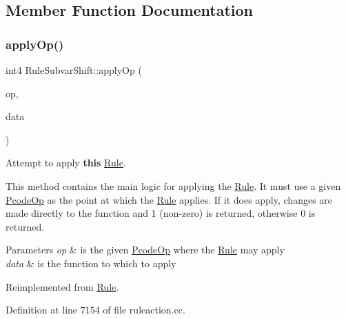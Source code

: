 \subsection{Member Function Documentation}
\mbox{\label{class_rule_subvar_shift_abfeba5a6e02b0d29a5cf98f34d3c3220}} 
\subsubsection{\texorpdfstring{applyOp()}{applyOp()}}
{\footnotesize\ttfamily int4 Rule\+Subvar\+Shift\+::apply\+Op (\begin{DoxyParamCaption}\item[{\mbox{\hyperlink{class_pcode_op}{Pcode\+Op}} $\ast$}]{op,  }\item[{\mbox{\hyperlink{class_funcdata}{Funcdata}} \&}]{data }\end{DoxyParamCaption})\hspace{0.3cm}{\ttfamily [virtual]}}



Attempt to apply {\bfseries{this}} \mbox{\hyperlink{class_rule}{Rule}}. 

This method contains the main logic for applying the \mbox{\hyperlink{class_rule}{Rule}}. It must use a given \mbox{\hyperlink{class_pcode_op}{Pcode\+Op}} as the point at which the \mbox{\hyperlink{class_rule}{Rule}} applies. If it does apply, changes are made directly to the function and 1 (non-\/zero) is returned, otherwise 0 is returned. 
\begin{DoxyParams}{Parameters}
{\em op} & is the given \mbox{\hyperlink{class_pcode_op}{Pcode\+Op}} where the \mbox{\hyperlink{class_rule}{Rule}} may apply \\
\hline
{\em data} & is the function to which to apply \\
\hline
\end{DoxyParams}


Reimplemented from \mbox{\hyperlink{class_rule_a4e3e61f066670175009f60fb9dc60848}{Rule}}.



Definition at line 7154 of file ruleaction.\+cc.

